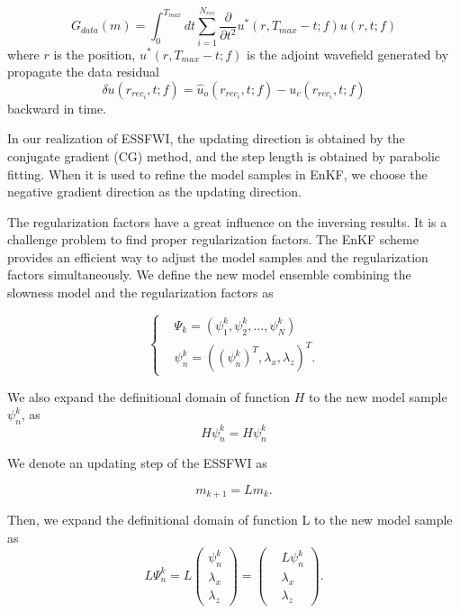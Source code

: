 \documentclass[mreferee]{gji}
\begin{document}
\begin{equation}
G_{data}(m)=\int_{0}^{T_{max}}dt\sum_{i=1}^{N_{rec}}\frac{\partial}{\partial t^2}u^*(r,T_{max}-t;f)u(r,t;f)
\end{equation}
where $r$ is the position, $u^*(r,T_{max}-t;f)$ is the adjoint wavefield generated by propagate the data residual
\begin{equation}
\delta u(r_{rec_i},t;f)=\hat u_o(r_{rec_i},t;f)-u_c(r_{rec_i},t;f)
\end{equation}
backward in time.

In our realization of ESSFWI, the updating direction is obtained by the conjugate gradient (CG) method, and the step length is obtained by parabolic fitting. When it is used to refine the model samples in EnKF, we choose the negative gradient direction as the updating direction.

The regularization factors have a great influence on the inversing results. It is a challenge problem to find proper regularization factors. The EnKF scheme provides an efficient way to adjust the model samples and the regularization factors simultaneously. We define the new model ensemble combining the slowness model and the regularization factors as

\begin{equation}
\left\{
\begin{aligned}
& \Psi_k=\left(\psi_1^k,\psi_2^k,...,\psi_N^k\right) \\
& \psi_n^k=\left((\psi_n^k)^T,\lambda_x,\lambda_z\right)^T.
\end{aligned}
\right.
\end{equation}

We also expand the definitional domain of function $H$ to the new model sample $\psi_n^k$, as
\begin{equation}
H\psi_n^{k}=H\psi_n^{k}
\end{equation}

We denote an updating step of the ESSFWI as

\begin{equation}
m_{k+1}=Lm_k.
\end{equation}

Then, we expand the definitional domain of function L to the new model sample as
\begin{equation}
L\Psi_n^k=L
\left(
\begin{aligned}
\psi_n^k \\
\lambda_x \\
\lambda_z
\end{aligned}
\right)
=
\left(
\begin{aligned}
& L\psi_n^k \\
& \lambda_x \\
& \lambda_z
\end{aligned}
\right).
\end{equation}
\end{document}
